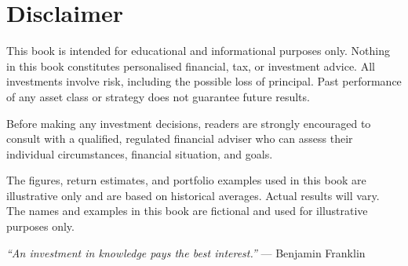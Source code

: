 \documentclass[12pt, a4paper]{book}
\begin{document}
\chapter*{Disclaimer}

This book is intended for educational and informational purposes only. Nothing in this book constitutes personalised financial, tax, or investment advice. All investments involve risk, including the possible loss of principal. Past performance of any asset class or strategy does not guarantee future results.

Before making any investment decisions, readers are strongly encouraged to consult with a qualified, regulated financial adviser who can assess their individual circumstances, financial situation, and goals.

The figures, return estimates, and portfolio examples used in this book are illustrative only and are based on historical averages. Actual results will vary. The names and examples in this book are fictional and used for illustrative purposes only.

\vspace{1cm}
{\small\textit{``An investment in knowledge pays the best interest.''} --- Benjamin Franklin}

\end{document}
